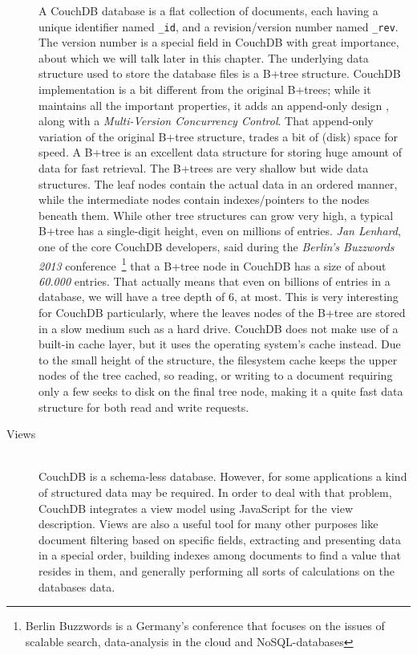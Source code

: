 \begin{description}
    A CouchDB database is a flat collection of documents, each having a unique
    identifier named \texttt{\_id}, and a revision/version number named
    \texttt{\_rev}. The version number is a special field in CouchDB with great
    importance, about which we will talk later in this chapter. The underlying
    data structure used to store the database files is a B+tree structure.
    CouchDB implementation is a bit different from the original B+trees; while
    it maintains all the important properties, it adds an append-only design
    , along with a
    \emph{Multi-Version Concurrency Control}. That append-only variation of the
    original B+tree structure, trades a bit of (disk) space for speed. A B+tree
    is an excellent data structure for storing huge amount of data for fast
    retrieval. The B+trees are very shallow but wide data structures. The leaf
    nodes contain the actual data in an ordered manner, while the intermediate
    nodes contain indexes/pointers to the nodes beneath them. While
    other tree structures can grow very high, a typical B+tree has a
    single-digit height, even on millions of entries. \emph{Jan Lenhard}, one of
    the core CouchDB developers, said during the \emph{Berlin's Buzzwords 2013}
    conference~\footnote{Berlin Buzzwords is a Germany's conference that
    focuses on the issues of scalable search, data-analysis in the cloud and
    NoSQL-databases} that a B+tree node in CouchDB has a size of about
    \emph{60.000} entries. That actually means that even on billions of entries
    in a database, we will have a tree depth of 6, at most. This is very
    interesting for CouchDB particularly, where the leaves nodes of the B+tree
    are stored in a slow medium such as a hard drive. CouchDB does not make use
    of a built-in cache layer, but it uses the operating system's cache instead.
    Due to the small height of the structure, the filesystem cache keeps the
    upper nodes of the tree cached, so reading, or writing to a document
    requiring only a few seeks to disk on the final tree node, making it a quite
    fast data structure for both read and write requests.


  \item[Views] \hfill \\
    CouchDB is a schema-less database. However, for some
    applications a kind of structured data may be required. In order to deal
    with that problem, CouchDB integrates a view model using JavaScript for the
    view description. Views are also a useful tool for many other purposes like
    document filtering based on specific fields, extracting and presenting data
    in a special order, building indexes among documents to find a value that
    resides in them, and generally performing all sorts of calculations on the
    databases data.


\end{description}

